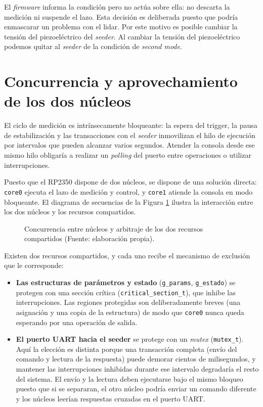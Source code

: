 El \emph{firmware} informa la condición pero no actúa sobre ella: no descarta la medición ni suspende el lazo. Esta decisión es deliberada puesto que podría enmascarar un problema con el lidar. Por este motivo es posible cambiar la tensión del piezoeléctrico del \emph{seeder}. Al cambiar la tensión del piezoeléctrico podemos quitar al \emph{seeder} de la condición de \emph{second mode}.

\section{Concurrencia y aprovechamiento de los dos núcleos}
\label{sec:fw-concurrencia}

El ciclo de medición es intrínsecamente bloqueante: la espera del trigger, la pausa de estabilización y las transacciones con el \emph{seeder} inmovilizan el hilo de ejecución por intervalos que pueden alcanzar varios segundos. Atender la consola desde ese mismo hilo obligaría a realizar un \textit{polling} del puerto entre operaciones o utilizar interrupciones.

Puesto que el RP2350 dispone de dos núcleos, se dispone de una solución directa: \texttt{core0} ejecuta el lazo de medición y control, y \texttt{core1} atiende la consola en modo bloqueante. El diagrama de secuencias de la Figura \ref{fig:fw-secuencia} ilustra la interacción entre los dos núcleos y los recursos compartidos.

\begin{figure}[htbp]
\centering
\resizebox{\textwidth}{!}{}
\caption[Concurrencia entre núcleos y arbitraje de recursos compartidos]%
{Concurrencia entre núcleos y arbitraje de los dos recursos compartidos (Fuente: elaboración propia).}
\label{fig:fw-secuencia}
\end{figure}

Existen dos recursos compartidos, y cada uno recibe el mecanismo de exclusión que le corresponde:

\begin{itemize}
\item \textbf{Las estructuras de parámetros y estado} (\texttt{g\_params}, \texttt{g\_estado}) se protegen con una sección crítica (\texttt{critical\_section\_t}), que inhibe las interrupciones. Las regiones protegidas son deliberadamente breves (una asignación y una copia de la estructura) de modo que \texttt{core0} nunca queda esperando por una operación de salida.

\item \textbf{El puerto UART hacia el seeder} se protege con un \emph{mutex} (\texttt{mutex\_t}). Aquí la elección es distinta porque una transacción completa (envío del comando y lectura de la respuesta) puede demorar cientos de milisegundos, y mantener las interrupciones inhibidas durante ese intervalo degradaría el resto del sistema. El envío y la lectura deben ejecutarse bajo el mismo bloqueo puesto que si se separaran, el otro núcleo podría enviar un comando diferente y los núcleos leerían respuestas cruzadas en el puerto UART.
\end{itemize}

